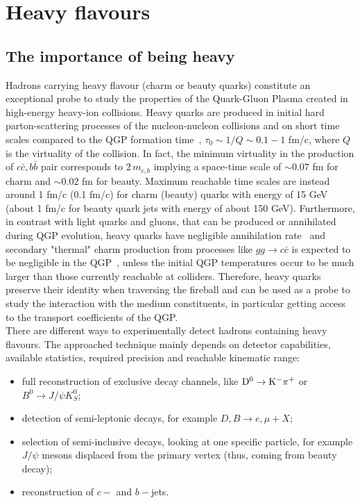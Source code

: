 
\chapter{Heavy flavours} %

\label{Chapter2} %

\section{The importance of being heavy}
Hadrons carrying heavy flavour (charm or beauty quarks) constitute an exceptional probe to study 
the properties of the Quark-Gluon Plasma created in high-energy heavy-ion collisions. Heavy quarks are produced in initial hard parton-scattering processes
of the nucleon-nucleon collisions and on short time scales compared to the QGP formation time~\cite{Liu:2012ax},
$\tau_0 \sim 1/Q \sim 0.1-1$ fm/c, where $Q$ is the virtuality of the collision. In fact,
the minimum virtuality in the production of $c\bar{c}, b\bar{b}$ pair corresponds to $2\, m_{c,b}$
implying a space-time scale of $\sim 0.07$ fm for charm and $\sim 0.02$ fm for beauty. Maximum
reachable time scales are instead around 1 fm/c (0.1 fm/c) for charm (beauty) quarks with energy of 15 GeV (about 1 fm/c for beauty quark jets with energy of about 150 GeV).
Furthermore, in contrast with light quarks and gluons, that can be produced or annihilated 
during QGP evolution, heavy quarks have negligible annihilation rate~\cite{BraunMunzinger:2007tn} and secondary "thermal" 
charm production from processes like $gg \rightarrow c\bar{c}$ is expected to be negligible in the QGP~\cite{Zhang:2007dm}, 
unless the initial QGP temperatures occur to be much larger than those currently reachable at colliders. Therefore,
heavy quarks preserve their identity when traversing the fireball and can be used as a probe
to study the interaction with the medium constituents, in particular getting access to the 
transport coefficients of the QGP.\\
There are different ways to experimentally detect hadrons containing heavy flavours. The approached technique
mainly depends on detector capabilities, available statistics, required precision and reachable kinematic
range:
\begin{itemize}
\item full reconstruction of exclusive decay channels, like ${\rm D^0\to K^-\pi^+}$ or $B^0 \rightarrow J/\psi K^0_S$;
\item detection of semi-leptonic decays, for example $D, B \rightarrow e, \mu + X$;
\item selection of semi-inclusive decays, looking at one specific particle, for example $J/\psi$ mesons displaced from the primary vertex (thus, coming from beauty decay);
\item reconstruction of $c-$ and $b-$jets.
\end{itemize}
